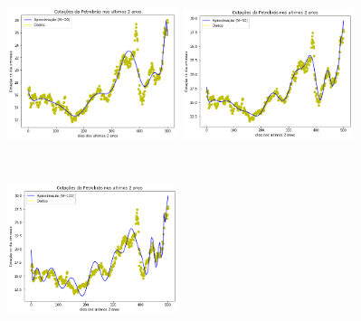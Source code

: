 \documentclass{article}
\begin{document}
\begin{figure}[!htb]
\includegraphics [width=5cm,height=5cm]{LU/G20.png}
\includegraphics [width=5cm,height=5cm]{LU/G50.png}
\includegraphics [width=5cm,height=5cm]{LU/G100.png}
\end{figure}

\newpage
\end{document}
